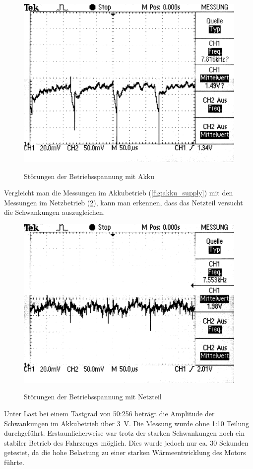 \begin{figure}[H]
\centering
\includegraphics[width=.8\textwidth]{VCC_AKKU.png}\\
\caption{Störungen der Betriebsspannung mit Akku}%
\label{fig:accu_supply}
\end{figure}


Vergleicht man die Messungen im Akkubetrieb (\cref{fig:akku_supply}) mit den Messungen im Netzbetrieb (\cref{fig:power_supply}), kann man erkennen, dass das Netzteil versucht die Schwankungen auszugleichen.

\begin{figure}[H]
\centering
\includegraphics[width=.8\textwidth]{VCC_SUPPLY.png}\\
\caption{Störungen der Betriebsspannung mit Netzteil}%
\label{fig:power_supply}
\end{figure}

Unter Last bei einem Tastgrad von 50:256 beträgt die Amplitude der Schwankungen im Akkubetrieb über \SI{3}{V}. Die Messung wurde ohne 1:10 Teilung durchgeführt.
Erstaunlicherweise war trotz der starken Schwankungen noch ein stabiler Betrieb des Fahrzeuges möglich. Dies wurde jedoch nur ca. 30 Sekunden getestet, da
die hohe Belastung zu einer starken Wärmeentwicklung des Motors führte.

